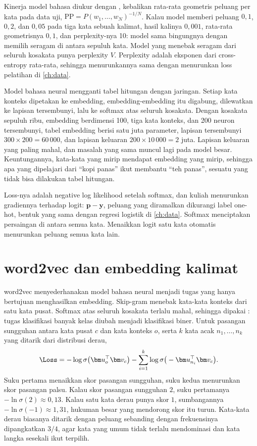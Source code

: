 Kinerja model bahasa diukur dengan , kebalikan rata-rata geometris peluang per kata pada data uji,
$\mathrm{PP}=P(w_1,\dots,w_N)^{-1/N}$. Kalau model memberi peluang $0{,}1$, $0{,}2$, dan $0{,}05$ pada tiga kata sebuah kalimat, hasil
kalinya $0{,}001$, rata-rata geometrisnya $0{,}1$, dan perplexity-nya 10: model sama bingungnya dengan memilih seragam di antara sepuluh
kata. Model yang menebak seragam dari seluruh kosakata punya perplexity $V$. Perplexity adalah eksponen dari cross-entropy rata-rata,
sehingga menurunkannya sama dengan menurunkan loss pelatihan di \cref{ch:data}.

Model bahasa neural \citep{bengio2003} mengganti tabel hitungan dengan jaringan. Setiap kata konteks dipetakan ke embedding,
embedding-embedding itu digabung, dilewatkan ke lapisan tersembunyi, lalu ke softmax atas seluruh kosakata. Dengan kosakata sepuluh
ribu, embedding berdimensi 100, tiga kata konteks, dan 200 neuron tersembunyi, tabel embedding berisi satu juta parameter, lapisan
tersembunyi $300\times200=60\,000$, dan lapisan keluaran $200\times10\,000=2$ juta. Lapisan keluaran yang paling mahal, dan masalah
yang sama muncul lagi pada model besar. Keuntungannya, kata-kata yang mirip mendapat embedding yang mirip, sehingga apa yang
dipelajari dari ``kopi panas'' ikut membantu ``teh panas'', sesuatu yang tidak bisa dilakukan tabel hitungan.

Loss-nya adalah negative log likelihood setelah softmax, dan kuliah menurunkan gradiennya terhadap logit: $\bm p-\bm y$, peluang
yang diramalkan dikurangi label one-hot, bentuk yang sama dengan regresi logistik di \cref{ch:data}. Softmax menciptakan
persaingan di antara semua kata. Menaikkan logit satu kata otomatis menurunkan peluang semua kata lain.

\section{word2vec dan embedding kalimat}

word2vec \citep{mikolov2013} menyederhanakan model bahasa neural menjadi tugas yang hanya bertujuan menghasilkan embedding. Skip-gram
menebak kata-kata konteks dari satu kata pusat. Softmax atas seluruh kosakata terlalu mahal, sehingga dipakai
: tugas klasifikasi banyak kelas diubah menjadi klasifikasi biner. Untuk pasangan sungguhan antara kata
pusat $c$ dan kata konteks $o$, serta $k$ kata acak $n_1,\dots,n_k$ yang ditarik dari distribusi derau,
\begin{equation}
\Loss=-\log\sigma\big(\bm u_o^\top\bm v_c\big)-\sum_{i=1}^k\log\sigma\big(-\bm u_{n_i}^\top\bm v_c\big).
\end{equation}
Suku pertama menaikkan skor pasangan sungguhan, suku kedua menurunkan skor pasangan palsu. Kalau skor pasangan sungguhan $2$, suku
pertamanya $-\ln\sigma(2)\approx0{,}13$. Kalau satu kata derau punya skor $1$, sumbangannya $-\ln\sigma(-1)\approx1{,}31$, hukuman besar
yang mendorong skor itu turun. Kata-kata derau biasanya ditarik dengan peluang sebanding dengan frekuensinya dipangkatkan $3/4$, agar
kata yang umum tidak terlalu mendominasi dan kata langka sesekali ikut terpilih.

